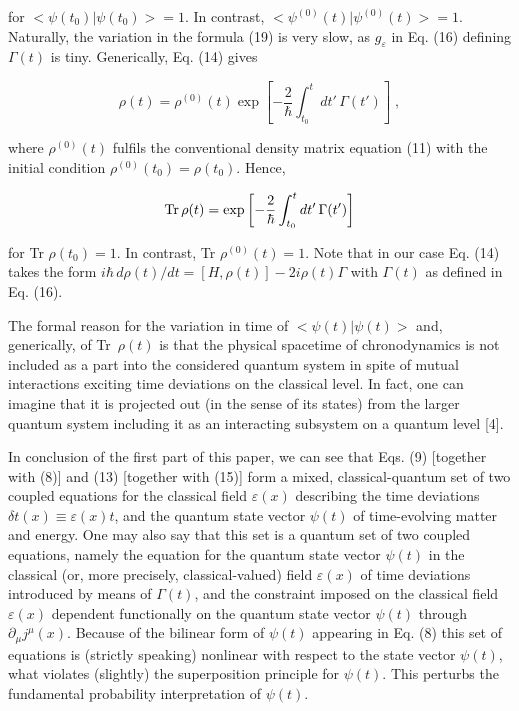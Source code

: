 \documentclass[a4paper,12pt]{article}
\begin{document}
\ni for $<\psi(t_0)|\psi(t_0)> = 1$. In contrast, $<\psi^{(0)}(t)|\psi^{(0)}(t)> = 1$. Naturally, the variation in the formula (19) is very slow, as $g_\varepsilon $ in Eq. (16) defining $\Gamma(t)$ is tiny. Generically, Eq. (14) gives

\begin{equation}
\rho(t) = \rho^{(0)}(t) \exp\left[ -\frac{2}{\hbar} \int^t_{t_0} dt'\, \Gamma(t')\right] \;,
\end{equation}

\ni where $\rho^{(0)}(t)$ fulfils the conventional density matrix equation (11) with the initial condition $\rho^{(0)}(t_0) = \rho(t_0)$. Hence,

\begin{equation}
{\rm Tr}\,\rho(t) = \exp\left[ -\frac{2}{\hbar} \int^t_{t_0} dt'\, \Gamma(t')\right] 
\end{equation}

\ni for Tr $\rho(t_0) = 1$. In contrast, Tr $\rho^{(0)}(t) = 1$. Note that in our case Eq. (14) takes the form
$i\hbar\, d\rho(t)/dt = [H,\rho(t)] - 2i\rho(t) \Gamma $ with $\Gamma(t)$ as defined in Eq. (16).

The formal reason for the variation in time of $<\!\psi(t)|\psi(t)\!>$ and, generically, of Tr~$\rho(t)$ is that the physical spacetime of chronodynamics is not included as a part into the considered quantum system in spite of mutual interactions exciting time deviations on the classical level. In fact, one can imagine that it is projected out (in the sense of its states) from the larger quantum system including it as an interacting subsystem on a quantum level [4].

In conclusion of the first part of this paper, we can see that Eqs. (9) [together with (8)] and (13) [together with (15)] form a mixed, classical-quantum set of two coupled equations for the classical field $\varepsilon(x)$ describing the time deviations $\delta t(x) \equiv \varepsilon(x) t$, and the quantum state vector $\psi(t)$ of time-evolving matter and energy. One may also say that this set is a quantum set of two coupled equations, namely the equation for the quantum state vector $\psi(t)$ in the classical (or, more precisely, classical-valued) field $\varepsilon(x)$ of time deviations introduced by means of $\Gamma (t)$, and the constraint imposed on the classical field $\varepsilon(x)$ dependent functionally on the quantum state vector $\psi(t)$ through $\partial_\mu j^\mu (x)$. Because of the bilinear form of $\psi(t)$ appearing in Eq. (8) this set of equations is (strictly speaking) nonlinear with respect to the state vector $\psi(t)$, what violates (slightly) the superposition principle for $\psi(t)$. This perturbs the fundamental probability interpretation of $\psi(t)$.
\end{document}
